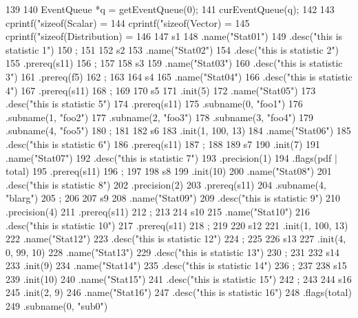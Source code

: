 \begin{DoxyCode}
139 {
140     EventQueue *q = getEventQueue(0);
141     curEventQueue(q);
142 
143     cprintf("sizeof(Scalar) = %
144     cprintf("sizeof(Vector) = %
145     cprintf("sizeof(Distribution) = %
146 
147     s1
148         .name("Stat01")
149         .desc("this is statistic 1")
150         ;
151 
152     s2
153         .name("Stat02")
154         .desc("this is statistic 2")
155         .prereq(s11)
156         ;
157 
158     s3
159         .name("Stat03")
160         .desc("this is statistic 3")
161         .prereq(f5)
162         ;
163 
164     s4
165         .name("Stat04")
166         .desc("this is statistic 4")
167         .prereq(s11)
168         ;
169 
170     s5
171         .init(5)
172         .name("Stat05")
173         .desc("this is statistic 5")
174         .prereq(s11)
175         .subname(0, "foo1")
176         .subname(1, "foo2")
177         .subname(2, "foo3")
178         .subname(3, "foo4")
179         .subname(4, "foo5")
180         ;
181 
182     s6
183         .init(1, 100, 13)
184         .name("Stat06")
185         .desc("this is statistic 6")
186         .prereq(s11)
187         ;
188 
189     s7
190         .init(7)
191         .name("Stat07")
192         .desc("this is statistic 7")
193         .precision(1)
194         .flags(pdf | total)
195         .prereq(s11)
196         ;
197 
198     s8
199         .init(10)
200         .name("Stat08")
201         .desc("this is statistic 8")
202         .precision(2)
203         .prereq(s11)
204         .subname(4, "blarg")
205         ;
206 
207     s9
208         .name("Stat09")
209         .desc("this is statistic 9")
210         .precision(4)
211         .prereq(s11)
212         ;
213 
214     s10
215         .name("Stat10")
216         .desc("this is statistic 10")
217         .prereq(s11)
218         ;
219 
220     s12
221         .init(1, 100, 13)
222         .name("Stat12")
223         .desc("this is statistic 12")
224         ;
225 
226     s13
227         .init(4, 0, 99, 10)
228         .name("Stat13")
229         .desc("this is statistic 13")
230         ;
231 
232     s14
233         .init(9)
234         .name("Stat14")
235         .desc("this is statistic 14")
236         ;
237 
238     s15
239         .init(10)
240         .name("Stat15")
241         .desc("this is statistic 15")
242         ;
243 
244     s16
245         .init(2, 9)
246         .name("Stat16")
247         .desc("this is statistic 16")
248         .flags(total)
249         .subname(0, "sub0")
}
\end{DoxyCode}
